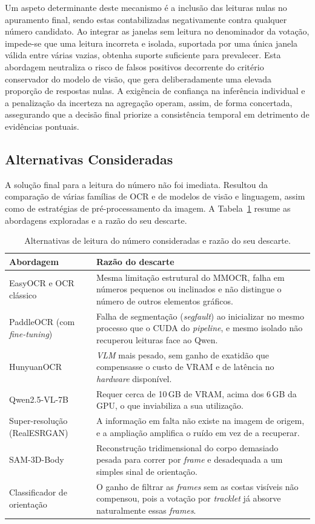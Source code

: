 Um aspeto determinante deste mecanismo é a inclusão das leituras nulas no apuramento final, sendo
estas contabilizadas negativamente contra qualquer número candidato. Ao integrar as janelas sem
leitura no denominador da votação, impede-se que uma leitura incorreta e isolada, suportada por
uma única janela válida entre várias vazias, obtenha suporte suficiente para prevalecer. Esta
abordagem neutraliza o risco de falsos positivos decorrente do critério conservador do modelo de
visão, que gera deliberadamente uma elevada proporção de respostas nulas. A exigência de confiança
na inferência individual e a penalização da incerteza na agregação operam, assim, de forma
concertada, assegurando que a decisão final priorize a consistência temporal em detrimento de
evidências pontuais.

\subsection{Alternativas Consideradas}

A solução final para a leitura do número não foi imediata. Resultou da comparação de várias famílias
de OCR e de modelos de visão e linguagem, assim como de estratégias de pré-processamento da imagem.
A Tabela~\ref{tab:alternativas} resume as abordagens exploradas e a razão do seu descarte.

\begin{table}[htbp]
\centering
\caption{Alternativas de leitura do número consideradas e razão do seu descarte.}
\label{tab:alternativas}
\renewcommand{\arraystretch}{1.35}
\setlength{\tabcolsep}{6pt}
\begin{tabular}{|p{3.6cm}|p{9.0cm}|}
\hline
\textbf{Abordagem} & \textbf{Razão do descarte} \\
\hline
EasyOCR e OCR clássico &
Mesma limitação estrutural do MMOCR, falha em números pequenos ou inclinados e não
distingue o número de outros elementos gráficos. \\
\hline
PaddleOCR (com \emph{fine-tuning}) &
Falha de segmentação (\emph{segfault}) ao inicializar no mesmo processo que o CUDA do
\emph{pipeline}, e mesmo isolado não recuperou leituras face ao Qwen. \\
\hline
HunyuanOCR &
\emph{VLM} mais pesado, sem ganho de exatidão que compensasse o custo de VRAM e de
latência no \emph{hardware} disponível. \\
\hline
Qwen2.5-VL-7B &
Requer cerca de 10\,GB de VRAM, acima dos 6\,GB da GPU, o que inviabiliza a sua
utilização. \\
\hline
Super-resolução (RealESRGAN) &
A informação em falta não existe na imagem de origem, e a ampliação amplifica o ruído
em vez de a recuperar. \\
\hline
SAM-3D-Body &
Reconstrução tridimensional do corpo demasiado pesada para correr por \emph{frame} e
desadequada a um simples sinal de orientação. \\
\hline
Classificador de orientação &
O ganho de filtrar as \emph{frames} sem as costas visíveis não compensou, pois a votação
por \emph{tracklet} já absorve naturalmente essas \emph{frames}. \\
\hline
\end{tabular}
\end{table}


